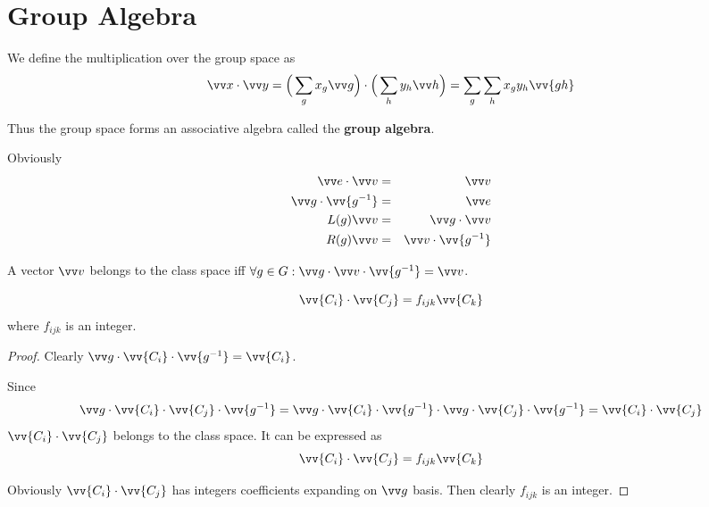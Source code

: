 \documentclass[12pt]{book}
\begin{document}
	\section{Group Algebra}
	\begin{definition}
			We define the multiplication over the group space as
	\begin{equation}
		\vv x\cdot\vv y=\Big(\sum_gx_g\vv g\Big)\cdot\Big(\sum_hy_h\vv h\Big)=\sum_g\sum_hx_gy_h\vv{gh}
	\end{equation}
	
	Thus the group space forms an associative algebra called the \textbf{group algebra}.
	\end{definition}

	
	Obviously
	\begin{eqnarray}
		\vv e\cdot\vv v&=&\vv v\\
		\vv g\cdot\vv{g^{-1}}&=&\vv e\\
		L(g)\vv v&=&\vv g\cdot\vv v\\
		R(g)\vv v&=&\vv v\cdot\vv{g^{-1}}
	\end{eqnarray}
	
	\begin{lemma}
		A vector $\vv v$ belongs to the class space iff $\forall g\in G:\vv g\cdot\vv v\cdot\vv{g^{-1}}=\vv v $.
	\end{lemma}
	
	\begin{lemma}
	\begin{equation}
		\vv{C_i}\cdot\vv{C_j}=f_{ijk}\vv{C_k}
	\end{equation}
	where $f_{ijk}$ is an integer.
	\end{lemma}
	\begin{proof}
	Clearly $\vv g\cdot\vv{C_i}\cdot\vv{g^{-1}}=\vv{C_i}$.
	
	Since
	\begin{equation}
		\vv g\cdot\vv{C_i}\cdot\vv{C_j}\cdot\vv{g^{-1}}=\vv g\cdot\vv{C_i}\cdot\vv{g^{-1}}\cdot\vv g\cdot\vv{C_j}\cdot\vv{g^{-1}}=\vv{C_i}\cdot\vv{C_j}
	\end{equation}
	$\vv{C_i}\cdot\vv{C_j}$ belongs to the class space. It can be expressed as
	\begin{equation}
		\vv{C_i}\cdot\vv{C_j}=f_{ijk}\vv{C_k}
		\label{eqn:class_vec_decomp}
	\end{equation}
	
	Obviously $\vv{C_i}\cdot\vv{C_j}$ has integers coefficients expanding on $\vv g$ basis. Then clearly $f_{ijk}$ is an integer.
	\end{proof}
	
\end{document}
